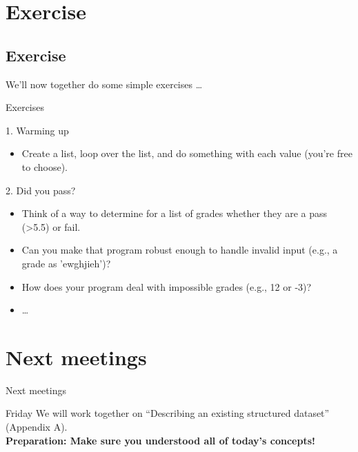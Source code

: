 \documentclass{beamer}
\begin{document}
\section{Exercise}
\subsection*{Exercise}
\begin{frame}
We'll now together do some simple exercises \ldots
\end{frame}



\begin{frame}{Exercises}
\begin{block}{1. Warming up}
\begin{itemize}
	\item Create a list, loop over the list, and do something with each value (you're free to choose). 
\end{itemize}
\end{block}
\begin{block}{2. Did you pass?}
	\begin{itemize}
	\item Think of a way to determine for a list of  grades whether they are a pass (>5.5) or fail.
	\item Can you make that program robust enough to handle invalid input (e.g., a grade as 'ewghjieh')?
	\item How does your program deal with impossible grades (e.g., 12 or -3)?
	\item \ldots
\end{itemize}
\end{block}
\end{frame}

\section{Next meetings}
\begin{frame}
Next meetings
\end{frame}


\begin{frame}{Friday}
	We will work together on ``Describing an existing structured dataset'' (Appendix A).\\
	\textbf{Preparation: Make sure you understood all of today's concepts!}
\end{frame}
\end{document}
